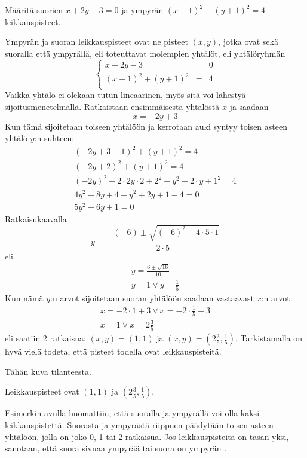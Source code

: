 \begin{esimerkki}
Määritä suorien $x+2y-3=0$ ja ympyrän $(x-1)^2+(y+1)^2=4 $ leikkauspisteet.

\begin{esimratk}

Ympyrän ja suoran leikkauspisteet ovat ne pisteet $(x,y)$, jotka ovat sekä suoralla että ympyrällä, eli toteuttavat molempien yhtälöt, eli yhtälöryhmän
$$\left\{    
    \begin{array}{rcl}
        x+2y-3 &=&0 \\
        (x-1)^2+(y+1)^2 &=&4 \\
    \end{array}
    \right.$$
Vaikka yhtälö ei olekaan tutun lineaarinen, myös sitä voi lähestyä sijoitusmenetelmällä. Ratkaistaan ensimmäisestä yhtälöstä $x$ ja saadaan
\[
x = -2y+3
\]
Kun tämä sijoitetaan toiseen yhtälöön ja kerrotaan auki syntyy toisen asteen yhtälö $y$:n suhteen:
\begin{align*}
(-2y+3-1)^2+(y+1)^2=4 \\
(-2y+2)^2+(y+1)^2=4 \\
(-2y)^2-2\cdot 2y\cdot 2 +2^2+y^2+2\cdot y+1^2=4 \\
4y^2-8y+4+y^2+2y+1-4 = 0 \\
5y^2-6y+1 = 0
\end{align*}
Ratkaisukaavalla
\[
y = \frac{-(-6)\pm\sqrt{(-6)^2-4\cdot 5\cdot 1}}{2\cdot5}
\]
eli
\begin{align*}
y = \frac{6\pm\sqrt{16}}{10} \\
y = 1 \vee y = \frac{1}{5}
\end{align*}
Kun nämä $y$:n arvot sijoitetaan suoran yhtälöön saadaan vastaavast $x$:n arvot:
\begin{align*}
x = -2\cdot 1+3 \vee x = -2\cdot\frac{1}{5}+3 \\
x = 1 \vee x = 2\frac{3}{5}
\end{align*}
eli saatiin 2 ratkaisua: $(x,y) = (1,1)$ ja $(x,y) = (2\frac{3}{5},\frac{1}{5})$. Tarkistamalla on hyvä vielä todeta, että pisteet todella ovat leikkauspisteitä.

Tähän kuva tilanteesta.
\begin{esimvast}
Leikkauspisteet ovat $(1,1)$ ja $(2\frac{3}{5},\frac{1}{5})$.
\end{esimvast}

\end{esimratk}
\end{esimerkki}

Esimerkin avulla huomattiin, että suoralla ja ympyrällä voi olla kaksi leikkauspistettä. Suorasta ja ympyrästä riippuen päädytään toisen asteen yhtälöön, jolla on joko 0, 1 tai 2 ratkaisua. Jos leikkauspisteitä on tasan yksi, sanotaan, että suora sivuaa ympyrää tai suora on ympyrän .

